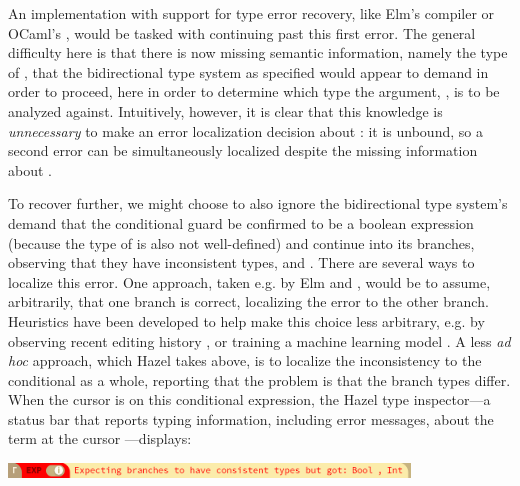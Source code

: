 An implementation with support for type error recovery, like Elm's compiler or OCaml's  \cite{bour2018merlin}, would 
 be tasked with continuing past this first error.
 The general difficulty here is that there is now missing semantic information, namely the type of , that 
 the bidirectional type system as specified 
 would appear to demand in order to proceed, here in order to determine which type the argument, , is to be analyzed against. 
 Intuitively, however, it is clear that this knowledge is \emph{unnecessary} to make an error localization decision about : 
it is unbound, so a second error can be simultaneously localized despite the missing information about . 

To recover further, we might choose to also ignore the bidirectional type system's demand that the conditional guard be confirmed to be a boolean expression 
(because the type of  is also not well-defined) 
and continue into its branches, observing that they have inconsistent types,  and . 
There are several ways to localize this error. 
One approach, taken e.g. by Elm and , would be to assume, arbitrarily, that one branch is correct, localizing the error to the other branch. 
Heuristics have been developed to help make this choice less arbitrary, e.g. 
by observing recent editing history \cite{steady-typing}, 
or training a machine learning model \cite{SeidelBlame}. 
A less \emph{ad hoc} approach, which Hazel takes above, is to localize the inconsistency to the conditional as a whole, reporting that the problem is that the branch types differ. When the cursor is on this conditional expression, the Hazel type inspector---a status bar that reports typing information, including error messages, about the term at the cursor \cite{potter2020hazel}---displays:

\begin{center}
  \includegraphics[width=0.8\textwidth]{images/haz3l-inconsistent-branches-cursor-inspector.png}
\end{center}

